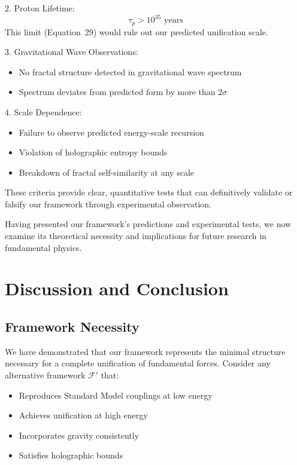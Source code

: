 \documentclass[12pt]{article}
\begin{document}
2. Proton Lifetime:
   \begin{equation}
   \tau_p > 10^{35} \text{ years}
   \end{equation}
   This limit (Equation~29) would rule out our predicted unification scale.

3. Gravitational Wave Observations:
   \begin{itemize}
   \item No fractal structure detected in gravitational wave spectrum
   \item Spectrum deviates from predicted form by more than $2\sigma$
   \end{itemize}

4. Scale Dependence:
   \begin{itemize}
   \item Failure to observe predicted energy-scale recursion
   \item Violation of holographic entropy bounds
   \item Breakdown of fractal self-similarity at any scale
   \end{itemize}

These criteria provide clear, quantitative tests that can definitively validate or falsify our framework through experimental observation.

Having presented our framework's predictions and experimental tests, we now examine its theoretical necessity and implications for future research in fundamental physics.

\section{Discussion and Conclusion}

\subsection{Framework Necessity}

We have demonstrated that our framework represents the minimal structure necessary for a complete unification of fundamental forces. Consider any alternative framework $\mathcal{F}'$ that:

\begin{itemize}
\item Reproduces Standard Model couplings at low energy
\item Achieves unification at high energy
\item Incorporates gravity consistently
\item Satisfies holographic bounds
\end{itemize}
\end{document}
